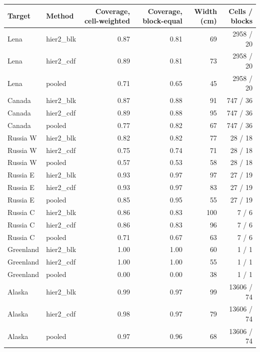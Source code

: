 \begin{tabular}{llrrrr}
\toprule
Target & Method & Coverage, cell-weighted & Coverage, block-equal & Width (cm) & Cells / blocks \\
\midrule
Lena & hier2\_blk & 0.87 & 0.81 & 69 & 2958 / 20 \\
Lena & hier2\_cdf & 0.89 & 0.81 & 73 & 2958 / 20 \\
Lena & pooled & 0.71 & 0.65 & 45 & 2958 / 20 \\
Canada & hier2\_blk & 0.87 & 0.88 & 91 & 747 / 36 \\
Canada & hier2\_cdf & 0.89 & 0.88 & 95 & 747 / 36 \\
Canada & pooled & 0.77 & 0.82 & 67 & 747 / 36 \\
Russia W & hier2\_blk & 0.82 & 0.82 & 77 & 28 / 18 \\
Russia W & hier2\_cdf & 0.75 & 0.74 & 71 & 28 / 18 \\
Russia W & pooled & 0.57 & 0.53 & 58 & 28 / 18 \\
Russia E & hier2\_blk & 0.93 & 0.97 & 97 & 27 / 19 \\
Russia E & hier2\_cdf & 0.93 & 0.97 & 83 & 27 / 19 \\
Russia E & pooled & 0.85 & 0.95 & 55 & 27 / 19 \\
Russia C & hier2\_blk & 0.86 & 0.83 & 100 & 7 / 6 \\
Russia C & hier2\_cdf & 0.86 & 0.83 & 96 & 7 / 6 \\
Russia C & pooled & 0.71 & 0.67 & 63 & 7 / 6 \\
Greenland & hier2\_blk & 1.00 & 1.00 & 60 & 1 / 1 \\
Greenland & hier2\_cdf & 1.00 & 1.00 & 55 & 1 / 1 \\
Greenland & pooled & 0.00 & 0.00 & 38 & 1 / 1 \\
Alaska & hier2\_blk & 0.99 & 0.97 & 99 & 13606 / 74 \\
Alaska & hier2\_cdf & 0.98 & 0.97 & 79 & 13606 / 74 \\
Alaska & pooled & 0.97 & 0.96 & 68 & 13606 / 74 \\
\bottomrule
\end{tabular}
